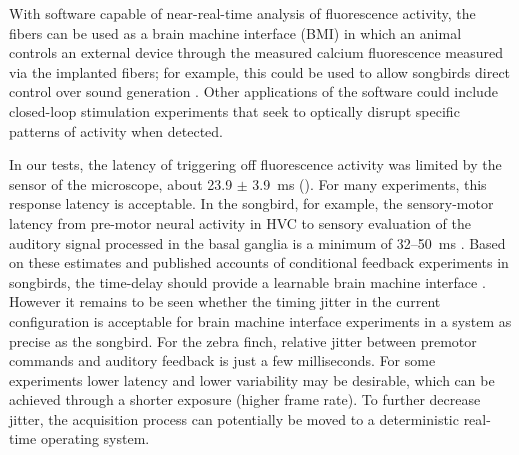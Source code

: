 With software capable of near-real-time analysis of
fluorescence activity, the fibers can be used as a 
brain machine interface (BMI) in which an animal controls 
an external device through the measured calcium fluorescence 
measured via the implanted fibers; for example, this could 
be used to allow songbirds direct control over sound 
generation \cite{Clancy:2014gw}. Other applications 
of the software could include closed-loop stimulation experiments 
that seek to optically disrupt specific patterns of 
activity when detected.

In our tests, the latency of triggering off 
fluorescence activity was limited by the sensor 
of the microscope, about 23.9 $\pm$ 3.9~ms 
(). For many experiments, 
this response latency is acceptable. In the songbird, 
for example, the sensory-motor latency from pre-motor 
neural activity in HVC to sensory evaluation of 
the auditory signal processed in the basal ganglia 
is a minimum of 32--50~ms \cite{Andalman:2009bh}. 
Based on these estimates and published accounts 
of conditional feedback experiments in songbirds, 
the time-delay should provide a learnable brain 
machine interface 
\cite{Olveczky:2005bp,Tumer:2007bi,Sakata:2008cm,Sober:2009ci}. 
However it remains to be seen whether the timing 
jitter in the current configuration is acceptable 
for brain machine interface experiments in a 
system as precise as the songbird. For the zebra 
finch, relative jitter between premotor commands 
and auditory feedback is just a few milliseconds. 
For some experiments lower latency and lower 
variability may be desirable, which can be achieved 
through a shorter exposure (higher frame rate). 
To further decrease jitter, the acquisition process 
can potentially be moved to a deterministic 
real-time operating system.

